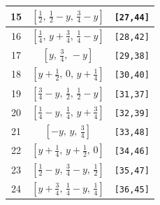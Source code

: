 \documentclass[fleqn,8pt]{jsarticle}
\begin{document}
\begin{longtable}{ccc}
15 & $\left[ \frac{1}{2},\, \frac{1}{2} - y,\, \frac{3}{4} - y \right]$ & {\tt [27,44]} \\ \hline
16 & $\left[ \frac{1}{4},\, y + \frac{3}{4},\, \frac{1}{4} - y \right]$ & {\tt [28,42]} \\ \hline
17 & $\left[ y,\, \frac{3}{4},\, - y \right]$ & {\tt [29,38]} \\ \hline
18 & $\left[ y + \frac{1}{2},\, 0,\, y + \frac{1}{4} \right]$ & {\tt [30,40]} \\ \hline
19 & $\left[ \frac{3}{4} - y,\, \frac{1}{2},\, \frac{1}{2} - y \right]$ & {\tt [31,37]} \\ \hline
20 & $\left[ \frac{1}{4} - y,\, \frac{1}{4},\, y + \frac{3}{4} \right]$ & {\tt [32,39]} \\ \hline
21 & $\left[ - y,\, y,\, \frac{3}{4} \right]$ & {\tt [33,48]} \\ \hline
22 & $\left[ y + \frac{1}{4},\, y + \frac{1}{2},\, 0 \right]$ & {\tt [34,46]} \\ \hline
23 & $\left[ \frac{1}{2} - y,\, \frac{3}{4} - y,\, \frac{1}{2} \right]$ & {\tt [35,47]} \\ \hline
24 & $\left[ y + \frac{3}{4},\, \frac{1}{4} - y,\, \frac{1}{4} \right]$ & {\tt [36,45]} \\
\end{longtable}
\renewcommand{\arraystretch}{1.2}
\end{document}
